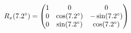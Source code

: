 \documentclass[preview]{standalone}
\begin{document}
\begin{align*}
\special{dvisvgm:raw <g id='unique000'>}R_x(7.2^\circ) = \begin{pmatrix} 1 & 0 & 0 \\ 0 & \cos(7.2^\circ) & -\sin(7.2^\circ) \\ 0 & \sin(7.2^\circ) & \cos(7.2^\circ) \end{pmatrix}\special{dvisvgm:raw </g>}
\end{align*}
\end{document}
